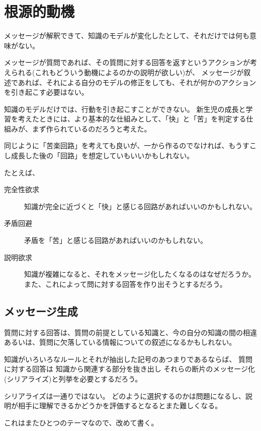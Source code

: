 \documentclass[10pt, oneside]{jarticle}   	%
\begin{document}
\section{根源的動機}
メッセージが解釈できて、知識のモデルが変化したとして、それだけでは何も意味がない。

メッセージが質問であれば、その質問に対する回答を返すというアクションが考えられる(これもどういう動機によるのかの説明が欲しい)が、
メッセージが叙述であれば、それによる自分のモデルの修正をしても、それが何かのアクションを引き起こす必要はない。

知識のモデルだけでは、行動を引き起こすことができない。
新生児の成長と学習を考えたときには、より基本的な仕組みとして、「快」と「苦」を判定する仕組みが、まず作られているのだろうと考えた。

同じように「苦楽回路」を考えても良いが、一から作るのでなければ、もうすこし成長した後の「回路」を想定していもいいかもしれない。

たとえば、
\begin{description}
\item [完全性欲求]知識が完全に近づくと「快」と感じる回路があればいいのかもしれない。
\item [矛盾回避] 矛盾を「苦」と感じる回路があればいいのかもしれない。
\item [説明欲求] 知識が複雑になると、それをメッセージ化したくなるのはなぜだろうか。また、これによって問に対する回答を作り出そうとするだろう。
\end{description}



\subsection{メッセージ生成}
質問に対する回答は、質問の前提としている知識と、今の自分の知識の間の相違あるいは、質問に欠落している情報についての叙述になるかもしれない。

知識がいろいろなルールとそれが抽出した記号のあつまりであるならば、
質問に対する回答は
知識から関連する部分を抜き出し
それらの断片のメッセージ化(シリアライズ)と列挙を必要とするだろう。

シリアライズは一通りではない。
どのように選択するのかは問題になるし、説明が相手に理解できるかどうかを評価するとなるとまた難しくなる。



これはまたひとつのテーマなので、改めて書く。



%
\end{document}
